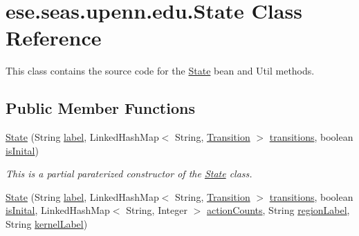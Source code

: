 \hypertarget{classese_1_1seas_1_1upenn_1_1edu_1_1_state}{}\section{ese.\+seas.\+upenn.\+edu.\+State Class Reference}
\label{classese_1_1seas_1_1upenn_1_1edu_1_1_state}


This class contains the source code for the \hyperlink{classese_1_1seas_1_1upenn_1_1edu_1_1_state}{State} bean and Util methods.  


\subsection*{Public Member Functions}
\begin{DoxyCompactItemize}
\item 
\hyperlink{classese_1_1seas_1_1upenn_1_1edu_1_1_state_a46c6ce319257a9522f8427cc51b4beca}{State} (String \hyperlink{classese_1_1seas_1_1upenn_1_1edu_1_1_state_a77f7c602d908f1ec56c65c00c230affd}{label}, Linked\+Hash\+Map$<$ String, \hyperlink{classese_1_1seas_1_1upenn_1_1edu_1_1_transition}{Transition} $>$ \hyperlink{classese_1_1seas_1_1upenn_1_1edu_1_1_state_aeac8f20207dd613d1b9f3524315d7ff3}{transitions}, boolean \hyperlink{classese_1_1seas_1_1upenn_1_1edu_1_1_state_aabc06e5afd914e3292820fd9fab31ceb}{is\+Inital})
\begin{DoxyCompactList}\small\item\em This is a partial paraterized constructor of the \hyperlink{classese_1_1seas_1_1upenn_1_1edu_1_1_state}{State} class. \end{DoxyCompactList}\item 
\hyperlink{classese_1_1seas_1_1upenn_1_1edu_1_1_state_a565b9e44a4d812b767834b423064e942}{State} (String \hyperlink{classese_1_1seas_1_1upenn_1_1edu_1_1_state_a77f7c602d908f1ec56c65c00c230affd}{label}, Linked\+Hash\+Map$<$ String, \hyperlink{classese_1_1seas_1_1upenn_1_1edu_1_1_transition}{Transition} $>$ \hyperlink{classese_1_1seas_1_1upenn_1_1edu_1_1_state_aeac8f20207dd613d1b9f3524315d7ff3}{transitions}, boolean \hyperlink{classese_1_1seas_1_1upenn_1_1edu_1_1_state_aabc06e5afd914e3292820fd9fab31ceb}{is\+Inital}, Linked\+Hash\+Map$<$ String, Integer $>$ \hyperlink{classese_1_1seas_1_1upenn_1_1edu_1_1_state_a75a043358cc508325468b834586638fc}{action\+Counts}, String \hyperlink{classese_1_1seas_1_1upenn_1_1edu_1_1_state_aca85473fdbd47fcee944387b2f11b5ac}{region\+Label}, String \hyperlink{classese_1_1seas_1_1upenn_1_1edu_1_1_state_a1988575cfbba31954fdf6e531da5755b}{kernel\+Label})

\end{DoxyCompactItemize}
